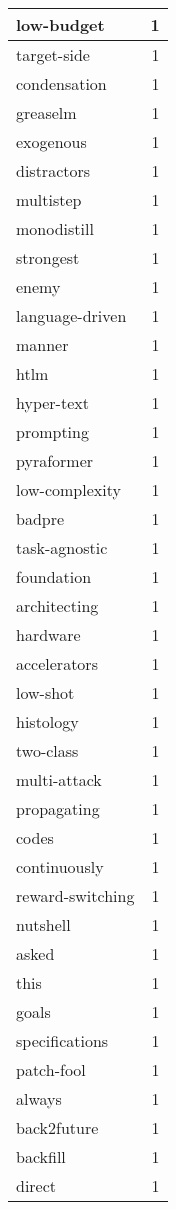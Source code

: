 \begin{table}[h]
\begin{tabular}{|l|r|}
\hline
low-budget & 1 \\
\hline
target-side & 1 \\
\hline
condensation & 1 \\
\hline
greaselm & 1 \\
\hline
exogenous & 1 \\
\hline
distractors & 1 \\
\hline
multistep & 1 \\
\hline
monodistill & 1 \\
\hline
strongest & 1 \\
\hline
enemy & 1 \\
\hline
language-driven & 1 \\
\hline
manner & 1 \\
\hline
htlm & 1 \\
\hline
hyper-text & 1 \\
\hline
prompting & 1 \\
\hline
pyraformer & 1 \\
\hline
low-complexity & 1 \\
\hline
badpre & 1 \\
\hline
task-agnostic & 1 \\
\hline
foundation & 1 \\
\hline
architecting & 1 \\
\hline
hardware & 1 \\
\hline
accelerators & 1 \\
\hline
low-shot & 1 \\
\hline
histology & 1 \\
\hline
two-class & 1 \\
\hline
multi-attack & 1 \\
\hline
propagating & 1 \\
\hline
codes & 1 \\
\hline
continuously & 1 \\
\hline
reward-switching & 1 \\
\hline
nutshell & 1 \\
\hline
asked & 1 \\
\hline
this & 1 \\
\hline
goals & 1 \\
\hline
specifications & 1 \\
\hline
patch-fool & 1 \\
\hline
always & 1 \\
\hline
back2future & 1 \\
\hline
backfill & 1 \\
\hline
direct & 1 \\

\end{tabular}
\end{table}
